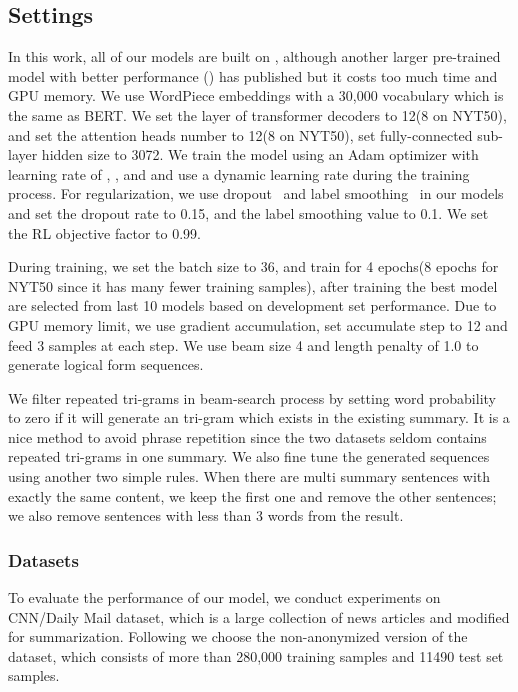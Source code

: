 \documentclass{article}
\begin{document}
\subsection{Settings}

In this work, all of our models are built on , although another larger pre-trained model with better performance () has published but it costs too much time and GPU memory. We use WordPiece embeddings with a 30,000 vocabulary which is the same as BERT. We set the layer of transformer decoders to 12(8 on NYT50), and set the attention heads number to 12(8 on NYT50), set fully-connected sub-layer hidden size to 3072. We train the model using an Adam optimizer with learning rate of , ,  and  and use a dynamic learning rate during the training process. For regularization, we use dropout~\cite{Srivastava2014Dropout} and label smoothing~\cite{Szegedy2015Rethinking} in our models and set the dropout rate to 0.15, and the label smoothing value to 0.1. We set the RL objective factor  to 0.99.

During training, we set the batch size to 36, and train for 4 epochs(8 epochs for NYT50 since it has many fewer training samples), after training the best model are selected from last 10 models based on development set performance. Due to GPU memory limit, we use gradient accumulation, set accumulate step to 12 and feed 3 samples at each step. We use beam size 4 and length penalty of 1.0 to generate logical form sequences.

We filter repeated tri-grams in beam-search process by setting word probability to zero if it will generate an tri-gram which exists in the existing summary. It is a nice method to avoid phrase repetition since the two datasets seldom contains repeated tri-grams in one summary. We also fine tune the generated sequences using another two simple rules. When there are multi summary sentences with exactly the same content, we keep the first one and remove the other sentences; we also remove sentences with less than 3 words from the result.

\subsubsection{Datasets}
To evaluate the performance of our model, we conduct experiments on CNN/Daily Mail dataset, which is a large collection of news articles and modified for summarization. Following \cite{See2017} we choose the non-anonymized version of the dataset, which consists of more than 280,000 training samples and 11490 test set samples. 
\end{document}

